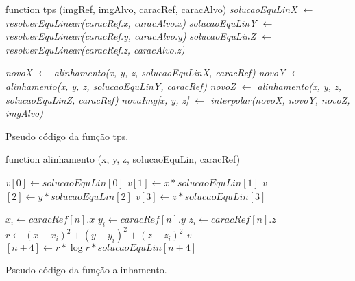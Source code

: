 \IncMargin{1em}
\begin{algorithm}

    \underline{function tps} (imgRef, imgAlvo, caracRef, caracAlvo)\;
    \emph{solucaoEquLinX $\leftarrow$ resolverEquLinear(caracRef.x, caracAlvo.x)} \;
    \emph{solucaoEquLinY $\leftarrow$ resolverEquLinear(caracRef.y, caracAlvo.y)} \;
    \emph{solucaoEquLinZ $\leftarrow$ resolverEquLinear(caracRef.z, caracAlvo.z)} \;

     {
       {
         {
            \emph{novoX $\leftarrow$ alinhamento(x, y, z, solucaoEquLinX, caracRef)} \;
            \emph{novoY $\leftarrow$ alinhamento(x, y, z, solucaoEquLinY, caracRef)} \;
            \emph{novoZ $\leftarrow$ alinhamento(x, y, z, solucaoEquLinZ, caracRef)} \;
            \emph{novaImg[x, y, z] $\leftarrow$ interpolar(novoX, novoY, novoZ, imgAlvo)} \;
        }
      }
    }
    \caption{Pseudo código da função tps.}\label{code:tps}
\end{algorithm}\DecMargin{1em}

\IncMargin{1em}
\begin{algorithm}

    \underline{function alinhamento} (x, y, z, solucaoEquLin, caracRef)\;

    \emph{v$[0] \leftarrow solucaoEquLin[0]$} \;
    \emph{v$[1] \leftarrow x * solucaoEquLin[1]$} \;
    \emph{v$[2] \leftarrow y * solucaoEquLin[2]$} \;
    \emph{v$[3] \leftarrow z * solucaoEquLin[3]$} \;

     {
        \emph{$x_i \leftarrow caracRef[n].x$} \;
        \emph{$y_i \leftarrow caracRef[n].y$} \;
        \emph{$z_i \leftarrow caracRef[n].z$} \;
        \emph{$r \leftarrow (x-x_i)^2 + (y-y_i)^2 + (z-z_i)^2$} \;
        \emph{v$[n+4] \leftarrow r * \log{r} * solucaoEquLin[n+4]$} \;
    }
    \caption{Pseudo código da função alinhamento.}\label{code:alinhamento}
\end{algorithm}\DecMargin{1em}


